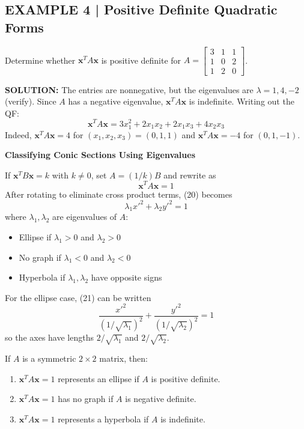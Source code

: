 \documentclass{article}
\newcommand{\redheading}[1]{{\vspace{2mm}\noindent\Large\bfseries\color{red!55!black} #1\par}\vspace{2mm}}
\begin{document}
\subsection*{EXAMPLE 4 | Positive Definite Quadratic Forms}

Determine whether $\mathbf{x}^T A\mathbf{x}$ is positive definite for
$A=\begin{bmatrix}3&1&1\\1&0&2\\1&2&0\end{bmatrix}$.

\textbf{SOLUTION:} The entries are nonnegative, but the eigenvalues are $\lambda=1,4,-2$
(verify). Since $A$ has a negative eigenvalue, $\mathbf{x}^T A\mathbf{x}$ is indefinite.
Writing out the QF:
\[
  \mathbf{x}^T A\mathbf{x} = 3x_1^2+2x_1x_2+2x_1x_3+4x_2x_3
\]
Indeed, $\mathbf{x}^T A\mathbf{x}=4$ for $(x_1,x_2,x_3)=(0,1,1)$ and $\mathbf{x}^T A\mathbf{x}=-4$
for $(0,1,-1)$.

\redheading{Classifying Conic Sections Using Eigenvalues}

If $\mathbf{x}^T B\mathbf{x}=k$ with $k\neq0$, set $A=(1/k)B$ and rewrite as
\begin{equation}
  \mathbf{x}^T A\mathbf{x}=1 \tag{20}
\end{equation}
After rotating to eliminate cross product terms, (20) becomes
\begin{equation}
  \lambda_1x'^2+\lambda_2y'^2=1 \tag{21}
\end{equation}
where $\lambda_1,\lambda_2$ are eigenvalues of $A$:
\begin{itemize}
  \item Ellipse if $\lambda_1>0$ and $\lambda_2>0$
  \item No graph if $\lambda_1<0$ and $\lambda_2<0$
  \item Hyperbola if $\lambda_1,\lambda_2$ have opposite signs
\end{itemize}
For the ellipse case, (21) can be written
\begin{equation}
  \frac{x'^2}{(1/\sqrt{\lambda_1})^2}+\frac{y'^2}{(1/\sqrt{\lambda_2})^2}=1 \tag{22}
\end{equation}
so the axes have lengths $2/\sqrt{\lambda_1}$ and $2/\sqrt{\lambda_2}$.

\begin{tcolorbox}[colback=red!4, colframe=red!60!black,
  title={\textbf{Theorem 7.3.3}}, boxrule=0.5mm, arc=3mm]
If $A$ is a symmetric $2\times2$ matrix, then:
\begin{enumerate}
  \item[(a)] $\mathbf{x}^T A\mathbf{x}=1$ represents an ellipse if $A$ is positive definite.
  \item[(b)] $\mathbf{x}^T A\mathbf{x}=1$ has no graph if $A$ is negative definite.
  \item[(c)] $\mathbf{x}^T A\mathbf{x}=1$ represents a hyperbola if $A$ is indefinite.
\end{enumerate}
\end{tcolorbox}
\end{document}
